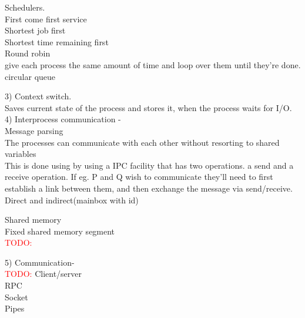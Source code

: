\documentclass[a4paper,10pt,titlepage]{report}
\begin{document}
\hspace{10mm} Schedulers.\\
\hspace{15mm} First come first service\\
\hspace{15mm} Shortest job first \\
\hspace{15mm} Shortest time remaining first \\
\hspace{15mm} Round robin\\
\hspace{15mm}give each process the same amount of time and loop over them until they're done. circular queue\\
\vspace{5mm}


3) Context switch.\\
\hspace{10mm} Saves current state of the process and stores it, when the process waits for I/O.\\
\vspace{5mm}
4) Interprocess communication - \\
\hspace{10mm}	Message parsing \\
\hspace{15mm}  	The processes can communicate with each other without resorting to shared variables	\\
\hspace{15mm} 	This is done using by using a IPC facility that has two operations. a send and a receive operation.
\hspace{15mm} 	If eg. P and Q wish to communicate they'll need to first establish a link between them, and then exchange the message via send/receive.
\hspace{15mm} Direct and indirect(mainbox with id)


\hspace{10mm}	Shared memory \\
\hspace{15mm}	Fixed shared memory segment \\
\hspace{15mm}\textcolor{red}{TODO:}
\vspace{5mm}

5) Communication-\\
\textcolor{red}{TODO:}
\hspace{10mm}	Client/server\\
\hspace{10mm}	RPC\\
\hspace{10mm}	Socket \\
\hspace{10mm}	Pipes\\
\vspace{5mm}
\end{document}
